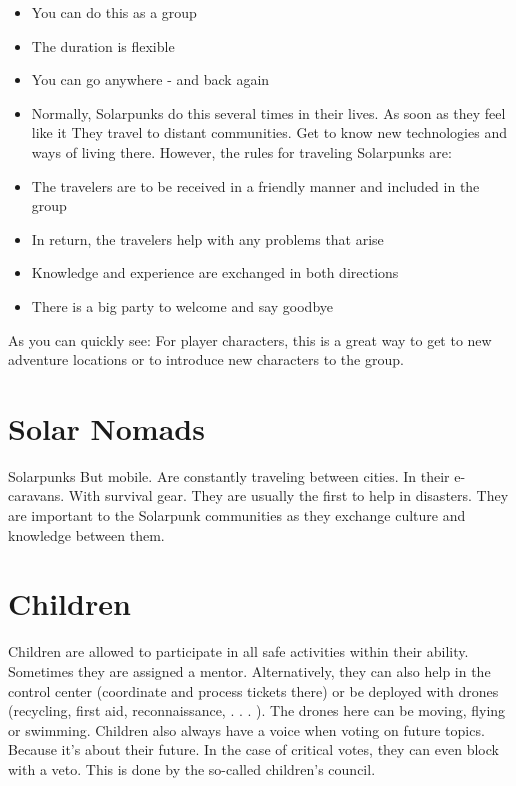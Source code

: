 \begin{itemize}
    \item You can do this as a group
    \item The duration is flexible
    \item You can go anywhere - and back again
    \item Normally, Solarpunks do this several times in their lives. As soon as they feel like it They travel to distant communities. Get to know new technologies and ways of living there. However, the rules for traveling Solarpunks are:
    \item The travelers are to be received in a friendly manner and included in the group
    \item In return, the travelers help with any problems that arise
    \item Knowledge and experience are exchanged in both directions
    \item There is a big party to welcome and say goodbye
\end{itemize}

As you can quickly see: For player characters, this is a great way to get to new adventure locations or to introduce new characters to the group.

\section{Solar Nomads}
Solarpunks But mobile. Are constantly traveling between cities. In their e-caravans. With survival gear. They are usually the first to help in disasters. They are important to the Solarpunk communities as they exchange culture and knowledge between them.


\section{Children}
Children are allowed to participate in all safe activities within their ability. Sometimes they are assigned a mentor. Alternatively, they can also help in the control center (coordinate and process tickets there) or be deployed with drones (recycling, first aid, reconnaissance, . . . ). The drones here can be moving, flying or swimming.
Children also always have a voice when voting on future topics. Because it's about their future.
In the case of critical votes, they can even block with a veto. This is done by the so-called children's council.

